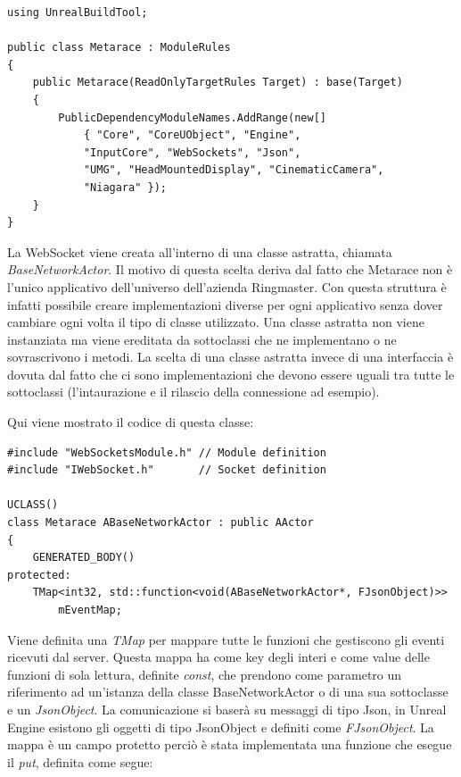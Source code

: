 \begin{lstlisting}[caption = Metarace.build.cs file, label={alg:build}]
using UnrealBuildTool;

public class Metarace : ModuleRules
{
	public Metarace(ReadOnlyTargetRules Target) : base(Target)
	{
		PublicDependencyModuleNames.AddRange(new[]
			{ "Core", "CoreUObject", "Engine", 
            "InputCore", "WebSockets", "Json", 
            "UMG", "HeadMountedDisplay", "CinematicCamera", 
            "Niagara" });
	}
}
\end{lstlisting}

La WebSocket viene creata all'interno di una classe astratta, chiamata \textit{BaseNetworkActor}.
%
Il motivo di questa scelta deriva dal fatto che Metarace non è l'unico applicativo dell'universo dell'azienda Ringmaster.
%
Con questa struttura è infatti possibile creare implementazioni diverse per ogni applicativo senza dover cambiare ogni volta il tipo di classe utilizzato.
%
Una classe astratta non viene instanziata ma viene ereditata da sottoclassi che ne implementano o ne sovrascrivono i metodi.
%
La scelta di una classe astratta invece di una interfaccia è dovuta dal fatto che ci sono implementazioni che devono essere uguali tra tutte le sottoclassi (l'intaurazione e il rilascio della connessione ad esempio).

Qui viene mostrato il codice di questa classe:

\begin{lstlisting}[caption = Sezione del file header di BaseNetworkActor dove vengono importati i moduli necessari alla WebSocket e viene definita la mappa degli eventi]
#include "WebSocketsModule.h" // Module definition
#include "IWebSocket.h"       // Socket definition

UCLASS()
class Metarace ABaseNetworkActor : public AActor
{
    GENERATED_BODY()
protected:
    TMap<int32, std::function<void(ABaseNetworkActor*, FJsonObject)>> 
        mEventMap;
\end{lstlisting}

Viene definita una \textit{TMap} per mappare tutte le funzioni che gestiscono gli eventi ricevuti dal server.
%
Questa mappa ha come key degli interi e come value delle funzioni di sola lettura, definite \textit{const}, che prendono come parametro un riferimento ad un'istanza della classe BaseNetworkActor o di una sua sottoclasse e un \textit{JsonObject}.
%
La comunicazione si baserà su messaggi di tipo Json, in Unreal Engine esistono gli oggetti di tipo JsonObject e definiti come \textit{FJsonObject}.
%
La mappa è un campo protetto perciò è stata implementata una funzione che esegue il \textit{put}, definita come segue:

